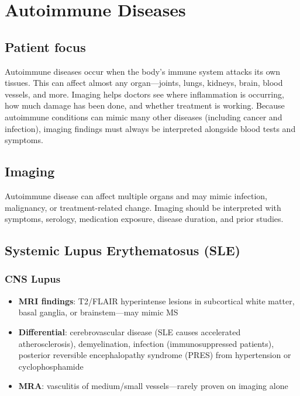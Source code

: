 \chapter{Autoimmune Diseases}

\section*{Patient focus}
Autoimmune diseases occur when the body's immune system attacks its own tissues. This can affect almost any organ---joints, lungs, kidneys, brain, blood vessels, and more. Imaging helps doctors see where inflammation is occurring, how much damage has been done, and whether treatment is working. Because autoimmune conditions can mimic many other diseases (including cancer and infection), imaging findings must always be interpreted alongside blood tests and symptoms.


\label{ch:ch67_autoimmune}

\section{Imaging}
Autoimmune disease can affect multiple organs and may mimic infection, malignancy, or treatment-related change. Imaging should be interpreted with symptoms, serology, medication exposure, disease duration, and prior studies.

\section{Systemic Lupus Erythematosus (SLE)}

\subsection{CNS Lupus}
\begin{itemize}
  \item \textbf{MRI findings}: T2/FLAIR hyperintense lesions in subcortical white matter, basal ganglia, or brainstem---may mimic MS
  \item \textbf{Differential}: cerebrovascular disease (SLE causes accelerated atherosclerosis), demyelination, infection (immunosuppressed patients), posterior reversible encephalopathy syndrome (PRES) from hypertension or cyclophosphamide
  \item \textbf{MRA}: vasculitis of medium/small vessels---rarely proven on imaging alone
\end{itemize}

